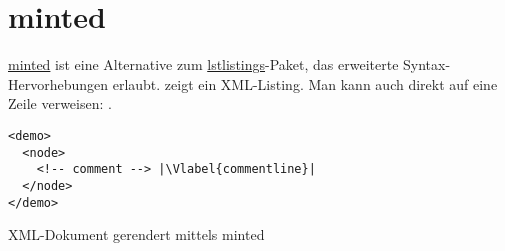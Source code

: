 \section{minted}

\href{https://github.com/gpoore/minted}{minted} ist eine Alternative zum \href{https://ctan.org/pkg/listings}{lstlistings}-Paket, das erweiterte Syntax-Hervorhebungen erlaubt.
 zeigt ein XML-Listing.
Man kann auch direkt auf eine Zeile verweisen: .

\begin{listing}[hb]
\begin{verbatim}
<demo>
  <node>
    <!-- comment --> |\Vlabel{commentline}|
  </node>
</demo>
\end{verbatim}
\caption{XML-Dokument gerendert mittels minted}
\label{lst:xml}
\end{listing}
